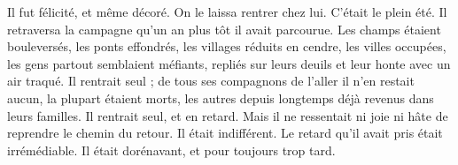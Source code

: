 {Il fut félicité, et même décoré. On le laissa rentrer chez lui. C’était le plein été. Il retraversa la campagne qu’un an plus tôt il avait parcourue. Les champs étaient bouleversés, les ponts effondrés, les villages réduits en cendre, les villes occupées, les gens partout semblaient méfiants, repliés sur leurs deuils et leur honte avec un air traqué. Il rentrait seul ; de tous ses compagnons de l’aller il n’en restait aucun, la plupart étaient morts, les autres depuis longtemps déjà revenus dans leurs familles. Il rentrait seul, et en retard. Mais il ne ressentait ni joie ni hâte de reprendre le chemin du retour. Il était indifférent. Le retard qu’il avait pris était irrémédiable. Il était dorénavant, et pour toujours trop tard.}


